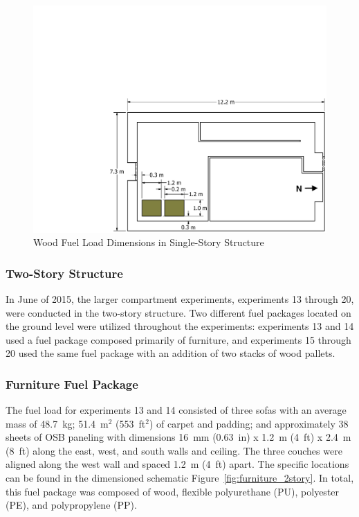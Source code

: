\documentclass[12pt,oneside]{book}
\begin{document}
\begin{figure}[!ht]
	\includegraphics[width=\columnwidth]{../Figures/Floor_Plans/PDFs/East_Structure/DelCo_2012_East_Structure_Pallets}
	\caption{Wood Fuel Load Dimensions in Single-Story Structure}
	\label{fig:Wood_Fuel_Load_Dimensions}
\end{figure}


\subsubsection*{Two-Story Structure}
\label{sec:suppresion_two}

In June of 2015, the larger compartment experiments, experiments 13 through 20, were conducted in the two-story structure.  Two different fuel packages located on the ground level were utilized throughout the experiments: experiments 13 and 14 used a fuel package composed primarily of furniture, and experiments 15 through 20 used the same fuel package with an addition of two stacks of wood pallets.   

\subsubsection{Furniture Fuel Package}
\label{sec:fire_suppression_furniture_fuel_2}

The fuel load for experiments 13 and 14 consisted of three sofas with an average mass of 48.7~kg; 51.4~m$^2$ (553~ft$^2$) of carpet and padding; and approximately 38 sheets of OSB paneling with dimensions 16~mm (0.63~in) x 1.2~m (4~ft) x 2.4~m (8~ft) along the east, west, and south walls and ceiling. The three couches were aligned along the west wall and spaced 1.2~m (4~ft) apart. The specific locations can be found in the dimensioned schematic Figure~\ref{fig:furniture_2story}. In total, this fuel package was composed of wood, flexible polyurethane (PU), polyester (PE), and polypropylene (PP).
\end{document}

